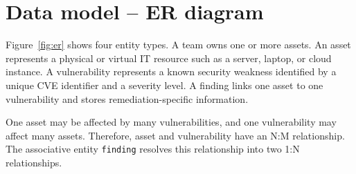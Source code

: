 \documentclass[11pt,a4paper]{article}
\begin{document}
\section{Data model -- ER diagram}

Figure~\ref{fig:er} shows four entity types. A team owns one or more assets. An
asset represents a physical or virtual IT resource such as a server, laptop, or
cloud instance. A vulnerability represents a known security weakness identified
by a unique CVE identifier and a severity level. A finding links one asset to
one vulnerability and stores remediation-specific information.

One asset may be affected by many vulnerabilities, and one vulnerability may
affect many assets. Therefore, asset and vulnerability have an N:M relationship.
The associative entity \texttt{finding} resolves this relationship into two
1:N relationships.
\end{document}

